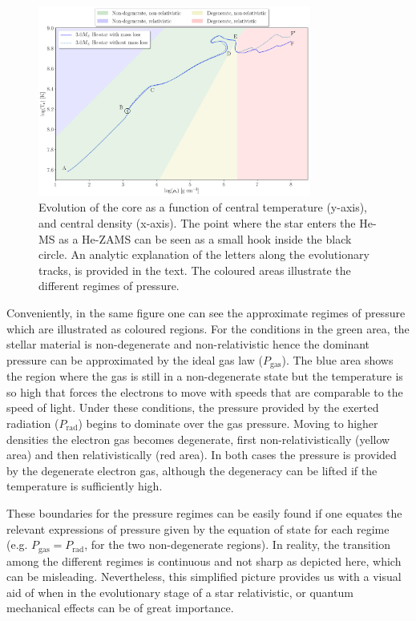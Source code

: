 \documentclass[../../main/thesis_msc.tex]{subfiles}
\begin{document}
				\begin{figure}[t]
					\centering
					\includegraphics[width=0.8\textwidth]{../figures/chapter1/T_rho_plane_ch1_shaded.png}
					\caption{Evolution of the core as a function of central temperature (y-axis), and central density (x-axis). The point where the star enters the He-MS as a He-ZAMS can be seen as a small hook inside the black circle. An analytic explanation of the letters along the evolutionary tracks, is provided in the text. The coloured areas illustrate the different regimes of pressure.}
					\label{fig:T_rho_plane_ch1}
				\end{figure}
				
				Conveniently, in the same figure one can see the approximate regimes of pressure which are illustrated as coloured regions. For the conditions in the green area, the stellar material is non-degenerate and non-relativistic hence the dominant pressure can be approximated by the ideal gas law ($P_{\text{gas}}$). The blue area shows the region where the gas is still in a non-degenerate state but the temperature is so high that forces the electrons to move with speeds that are comparable to the speed of light. Under these conditions, the pressure provided by the exerted radiation ($P_{\text{rad}}$) begins to dominate over the gas pressure. Moving to higher densities the electron gas becomes degenerate, first non-relativistically (yellow area) and then relativistically (red area). In both cases the pressure is provided by the degenerate electron gas, although the degeneracy can be lifted if the temperature is sufficiently high. 
				
				These boundaries for the pressure regimes can be easily found if one equates the relevant expressions of pressure given by the equation of state for each regime (e.g. $P_{\text{gas}} = P_{\text{rad}}$, for the two non-degenerate regions). In reality, the transition among the different regimes is continuous and not sharp as depicted here, which can be misleading. Nevertheless, this simplified picture provides us with a visual aid of when in the evolutionary stage of a star relativistic, or quantum mechanical effects can be of great importance.
				
\end{document}
